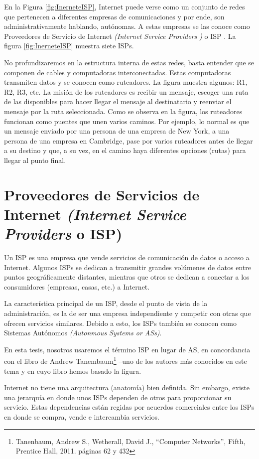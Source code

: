 \documentclass[12pt]{report} %
\begin{document}
En la Figura \ref{fig:InerneteISP}, Internet puede verse como un conjunto de redes que pertenecen a diferentes empresas de comunicaciones y por ende, son administrativamente hablando, autónomas. A estas empresas se las conoce como Proveedores de Servicio de Internet \textit{(Internet Service Providers )} o ISP . La figura \ref{fig:InerneteISP} muestra siete ISPs.

No profundizaremos en la estructura interna de estas redes, basta entender que se componen de cables y computadoras interconectadas. Estas computadoras transmiten datos y se conocen como ruteadores. La figura muestra algunos: R1, R2, R3, etc.  La misión de los ruteadores es recibir un mensaje, escoger una ruta de las disponibles para hacer llegar el mensaje al destinatario y reenviar el mensaje por la ruta seleccionada. Como se observa en la figura, los ruteadores funcionan como puentes que unen varios caminos. Por ejemplo, lo normal es que un mensaje enviado por una persona de una empresa de New York, a una persona de una empresa en Cambridge, pase por varios ruteadores antes de llegar a su destino y que, a su vez, en el camino haya diferentes opciones (rutas) para llegar al punto final.

\section{Proveedores de Servicios de Internet \textit{(Internet Service Providers} o ISP)}

Un ISP es una empresa que vende servicios de comunicación de datos o acceso a Internet. Algunos ISPs se dedican a transmitir grandes volúmenes de datos entre puntos geográficamente distantes, mientras que otros se dedican a conectar a los consumidores (empresas, casas, etc.) a Internet.

La característica principal de un ISP, desde el punto de vista de la administración, es la de ser una empresa independiente y competir con otras que ofrecen servicios similares. Debido a esto, los ISPs también se conocen como Sistemas Autónomos \textit{(Autonmous Systems or ASs)}. 

En esta tesis, nosotros usaremos el término ISP en lugar de AS, en concordancia con el libro de Andrew Tanembaum\footnote{Tanenbaum, Andrew S., Wetherall, David J., “Computer Networks”, Fifth, Prentice Hall, 2011. páginas 62 y 432}  –uno de los autores más conocidos en este tema y en cuyo libro hemos basado la figura.

Internet no tiene una arquitectura (anatomía) bien definida. Sin embargo, existe una jerarquía en donde unos ISPs dependen de otros para proporcionar  su servicio. Estas dependencias están regidas por acuerdos comerciales entre los ISPs en donde se compra, vende e intercambia servicios.
\end{document}
